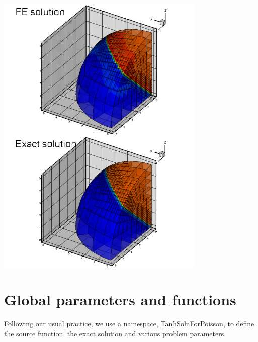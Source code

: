  
\begin{DoxyImage}
\includegraphics[width=0.75\textwidth]{eight_sphere_poisson}
\end{DoxyImage}




 

\hypertarget{index_global}{}\section{Global parameters and functions}\label{index_global}
Following our usual practice, we use a namespace, {\ttfamily \hyperlink{namespaceTanhSolnForPoisson}{Tanh\+Soln\+For\+Poisson}}, to define the source function, the exact solution and various problem parameters.

